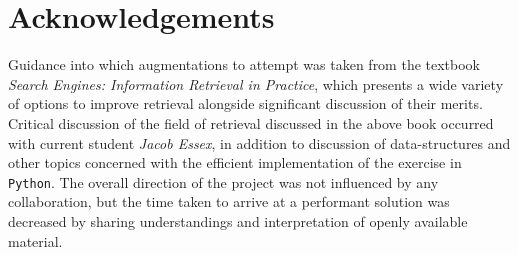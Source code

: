 \documentclass[10pt, a4paper, twocolumn]{article}   	%
\begin{document}
\section{Acknowledgements}
Guidance into which augmentations to attempt was taken from the textbook \emph{Search Engines: Information Retrieval in Practice}, which presents a wide variety of options to improve retrieval alongside significant discussion of their merits. Critical discussion of the field of retrieval discussed in the above book occurred with current student \emph{Jacob Essex}, in addition to discussion of data-structures and other topics concerned with the efficient implementation of the exercise in \verb|Python|. The overall direction of the project was not influenced by any collaboration, but the time taken to arrive at a performant solution was decreased by sharing understandings and interpretation of openly available material.
\end{document}
